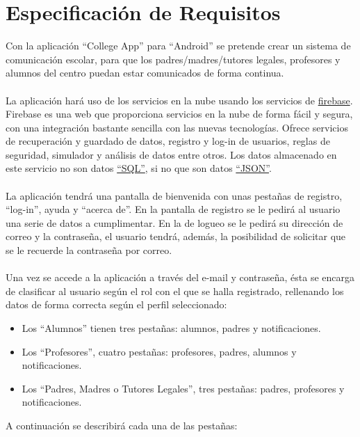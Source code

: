 %
%
%
%

\cleardoublepage
\chapter{Especificaci\'on de Requisitos}
\label{chap:requirements}

Con la aplicaci\'on ``College App'' para ``Android'' se pretende crear un sistema de comunicaci\'on escolar, para que los padres/madres/tutores legales, profesores y alumnos del centro puedan estar comunicados de forma continua.\\
\\ 
La aplicaci\'on har\'a uso de los servicios en la nube usando los servicios de \href{https://www.firebase.com/}{firebase}.
Firebase es una web que proporciona servicios en la nube de forma f\'acil y segura, con una integraci\'on bastante sencilla con las nuevas tecnolog\'ias. Ofrece servicios de recuperaci\'on y guardado de datos, registro y log-in de usuarios, reglas de seguridad, simulador y an\'alisis de datos entre otros. Los datos almacenado en este servicio no son datos \href{http://es.wikipedia.org/wiki/SQL}{``SQL''}, si no que son datos \href{http://es.wikipedia.org/wiki/JSON}{``JSON''}.\\
\\
La aplicaci\'on tendr\'a una pantalla de bienvenida con unas pesta\~nas de registro, ``log-in'', ayuda y ``acerca de''. En la pantalla de registro se le pedir\'a al usuario una serie de datos a cumplimentar. En la de logueo se le pedirá su direcci\'on de correo y la contrase\~na, el usuario tendr\'a, adem\'as, la posibilidad de solicitar que se le recuerde la contrase\~na por correo.\\
\\
Una vez se accede a la aplicaci\'on a trav\'es del e-mail y contrase\~na, \'esta se encarga de clasificar al usuario seg\'un el rol con el que se halla registrado, rellenando los datos de forma correcta seg\'un el perfil seleccionado:
\begin{itemize}
	\item Los ``Alumnos'' tienen tres pesta\~nas: alumnos, padres y notificaciones.
	\item Los ``Profesores'', cuatro pesta\~nas: profesores, padres, alumnos y notificaciones.
	\item Los ``Padres, Madres o Tutores Legales'', tres pesta\~nas: padres, profesores y notificaciones.\linebreak
\end{itemize}A continuaci\'on se describir\'a cada una de las pesta\~nas:
